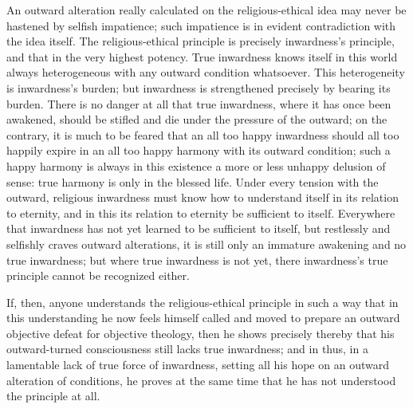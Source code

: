 \documentclass[12pt,a4paper]{book}
\begin{document}
An outward alteration really calculated on the religious-ethical idea may never be hastened by selfish
impatience; such
impatience is in evident contradiction with the idea itself. The religious-ethical principle is precisely
inwardness's principle, and that in the very highest potency. True inwardness knows itself in this world
always heterogeneous with any outward condition whatsoever. This heterogeneity is inwardness's burden; but
inwardness is strengthened precisely by bearing its burden. There is no danger at all that true inwardness,
where it has once been awakened, should be stifled and die under the pressure of the outward; on the
contrary, it is much to be feared that an all too happy inwardness should all too happily expire in an all
too happy harmony with its outward condition; such a happy harmony is always in this existence a more or
less unhappy delusion of sense: true harmony is only in the blessed life. Under every tension with the
outward, religious inwardness must know how to understand itself in its relation to eternity, and in this
its relation to eternity be sufficient to itself. Everywhere that inwardness has not yet learned to be
sufficient to itself, but restlessly and selfishly craves outward alterations, it is still only an immature
awakening and no true inwardness; but where true inwardness is not yet, there inwardness's true principle
cannot be recognized either.

If, then, anyone understands the religious-ethical principle in such a way that in this understanding he
now feels himself called and
moved to prepare an outward objective defeat for objective theology, then he shows precisely thereby that
his outward-turned consciousness still lacks true inwardness; and in thus, in a lamentable lack of true
force of inwardness, setting all his hope on an outward alteration of conditions, he proves at the same
time that he has not understood the principle at all.
\end{document}
